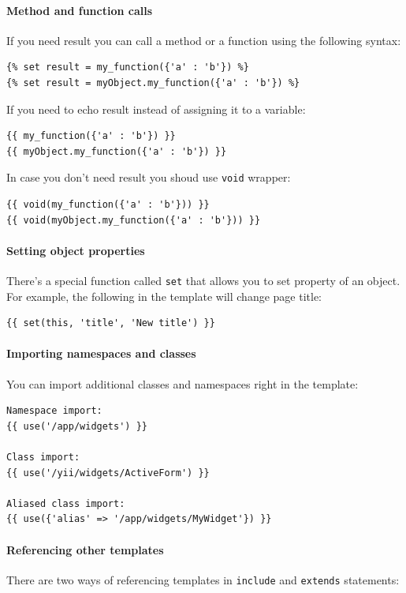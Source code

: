 \paragraph{Method and function calls}
If you need result you can call a method or a function using the following syntax:

\begin{lstlisting}
{% set result = my_function({'a' : 'b'}) %}
{% set result = myObject.my_function({'a' : 'b'}) %}
\end{lstlisting}
If you need to echo result instead of assigning it to a variable:

\begin{lstlisting}
{{ my_function({'a' : 'b'}) }}
{{ myObject.my_function({'a' : 'b'}) }}
\end{lstlisting}
In case you don't need result you shoud use \lstinline|void| wrapper:

\begin{lstlisting}
{{ void(my_function({'a' : 'b'})) }}
{{ void(myObject.my_function({'a' : 'b'})) }}
\end{lstlisting}
\paragraph{Setting object properties}
There's a special function called \lstinline|set| that allows you to set property of an object. For example, the following
in the template will change page title:

\begin{lstlisting}
{{ set(this, 'title', 'New title') }}
\end{lstlisting}
\paragraph{Importing namespaces and classes}
You can import additional classes and namespaces right in the template:

\begin{lstlisting}
Namespace import:
{{ use('/app/widgets') }}

Class import:
{{ use('/yii/widgets/ActiveForm') }}

Aliased class import:
{{ use({'alias' => '/app/widgets/MyWidget'}) }}
\end{lstlisting}
\paragraph{Referencing other templates}
There are two ways of referencing templates in \lstinline|include| and \lstinline|extends| statements:

